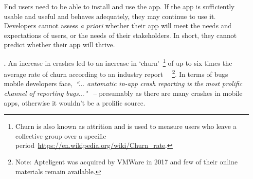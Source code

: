 End users need to be able to install and use the app. If the app is sufficiently usable and useful and behaves adequately, they may continue to use it. Developers cannot assess \emph{a priori} whether their app will meet the needs and expectations of users, or the needs of their stakeholders.
In short, they cannot predict whether their app will thrive.


\medskip
{}. An increase in crashes led to an increase in `churn'~\footnote{Churn is also known as attrition and is used to measure users who leave a collective group over a specific period~\url{https://en.wikipedia.org/wiki/Churn_rate}.} of up to six times the average rate of churn according to an industry report ~\citep{levy2016_crash_and_churn_report, levy2017_the_crash_and_burn_report_findings}~\footnote{Note: Apteligent was acquired by VMWare in 2017 and few of their online materials remain available.}. %
In terms of bugs mobile developers face,~\emph{``... automatic in-app crash reporting is the most prolific channel of reporting bugs..."}~\citep{alsubaihin2019app_store_effects_on_software_engineering} %
-- presumably as there are many crashes in mobile apps, otherwise it wouldn't be a prolific source. 


